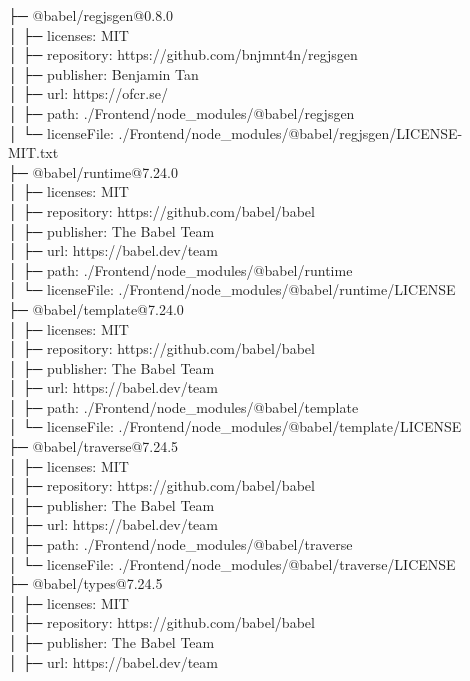 ├─ @babel/regjsgen@0.8.0\\
│  ├─ licenses: MIT\\
│  ├─ repository: https://github.com/bnjmnt4n/regjsgen\\
│  ├─ publisher: Benjamin Tan\\
│  ├─ url: https://ofcr.se/\\
│  ├─ path: ./Frontend/node\_modules/@babel/regjsgen\\
│  └─ licenseFile: ./Frontend/node\_modules/@babel/regjsgen/LICENSE-MIT.txt\\
├─ @babel/runtime@7.24.0\\
│  ├─ licenses: MIT\\
│  ├─ repository: https://github.com/babel/babel\\
│  ├─ publisher: The Babel Team\\
│  ├─ url: https://babel.dev/team\\
│  ├─ path: ./Frontend/node\_modules/@babel/runtime\\
│  └─ licenseFile: ./Frontend/node\_modules/@babel/runtime/LICENSE\\
├─ @babel/template@7.24.0\\
│  ├─ licenses: MIT\\
│  ├─ repository: https://github.com/babel/babel\\
│  ├─ publisher: The Babel Team\\
│  ├─ url: https://babel.dev/team\\
│  ├─ path: ./Frontend/node\_modules/@babel/template\\
│  └─ licenseFile: ./Frontend/node\_modules/@babel/template/LICENSE\\
├─ @babel/traverse@7.24.5\\
│  ├─ licenses: MIT\\
│  ├─ repository: https://github.com/babel/babel\\
│  ├─ publisher: The Babel Team\\
│  ├─ url: https://babel.dev/team\\
│  ├─ path: ./Frontend/node\_modules/@babel/traverse\\
│  └─ licenseFile: ./Frontend/node\_modules/@babel/traverse/LICENSE\\
├─ @babel/types@7.24.5\\
│  ├─ licenses: MIT\\
│  ├─ repository: https://github.com/babel/babel\\
│  ├─ publisher: The Babel Team\\
│  ├─ url: https://babel.dev/team\\
